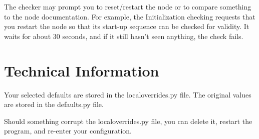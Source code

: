 \documentclass[11pt]{article}
\begin{document}
The checker may prompt you to reset/restart the node or to 
compare something to the node documentation. For example, 
the Initialization checking requests that you restart the node
so that its start-up sequence can be checked for validity.
It waits for about 30 seconds, and if it still hasn't seen anything, the
check fails.

\section{Technical Information}

Your selected defaults are stored in the localoverrides.py file.
The original values are stored in the defaults.py file.

Should something corrupt the localoverrides.py file,
you can delete it, restart the program, and re-enter your configuration.
\end{document}
